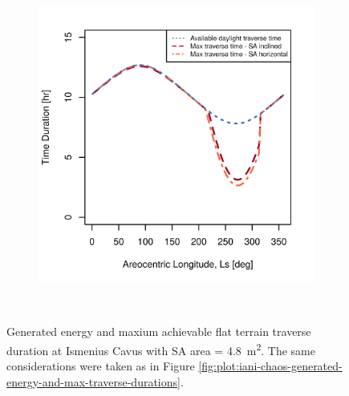 \begin{figure}[h]
\begin{subfigure}[t]{\subfigureWidth}
        \includegraphics[height=\graphicsHeight]{sections/design/solar-array/plots/ismeniuscavus-75w-max-traverse-durations-for-sa-area-48m2.png}
		\label{fig:plot:sub:ismenius-cavus-max-traverse-durations}
	\end{subfigure}\\[0.8ex]
    \caption[Generated energy and maxium achievable flat terrain traverse durations at Ismenius Cavus]
            {Generated energy and maxium achievable flat terrain traverse duration at Ismenius Cavus with \ac{SA} area = \SI{4.8}{m^{2}}. The same considerations were taken as in Figure \ref{fig:plot:iani-chaos-generated-energy-and-max-traverse-durations}.}
    \label{fig:plot:ismenius-cavus-generated-energy-and-max-traverse-durations}
\vspace{-2ex}
\end{figure}

